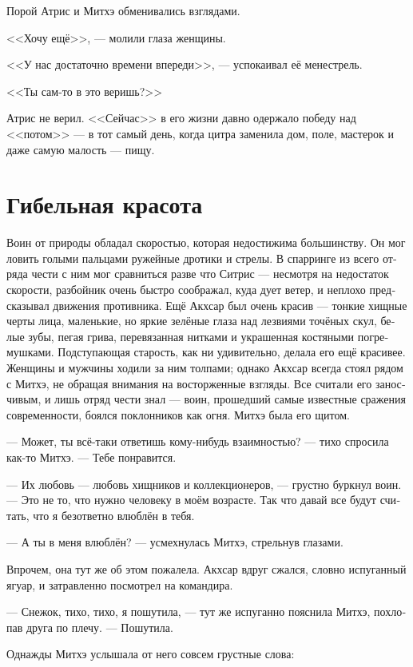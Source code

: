 \documentclass[a4paper,12pt,fleqn]{book}\usepackage{cooltooltips}\usepackage{polyglossia}\setdefaultlanguage[babelshorthands=true]{russian}\setotherlanguage{english}\defaultfontfeatures{Ligatures=TeX,Mapping=tex-text} \usepackage{xcolor}\definecolor{lightgray}{HTML}{bbbbbb}\color{lightgray}\newcommand{\ml}[3]{\textenglish{\textcolor{black}{#3}}}
\begin{document}
{Порой Атрис и Митхэ обменивались взглядами.

<<Хочу ещё>>, --- молили глаза женщины.

<<У нас достаточно времени впереди>>, --- успокаивал её менестрель.

<<Ты сам-то в это веришь?>>

Атрис не верил.
<<Сейчас>> в его жизни давно одержало победу над <<потом>> --- в тот самый день, когда цитра заменила дом, поле, мастерок и даже самую малость --- пищу.

\section{Гибельная красота}

Воин от природы обладал скоростью, которая недостижима большинству.
Он мог ловить голыми пальцами ружейные дротики и стрелы.
В спарринге из всего отряда чести с ним мог сравниться разве что Ситрис --- несмотря на недостаток скорости, разбойник очень быстро соображал, куда дует ветер, и неплохо предсказывал движения противника.
Ещё Акхсар был очень красив --- тонкие хищные черты лица, маленькие, но яркие зелёные глаза над лезвиями точёных скул, белые зубы, пегая грива, перевязанная нитками и украшенная костяными погремушками.
Подступающая старость, как ни удивительно, делала его ещё красивее.
Женщины и мужчины ходили за ним толпами;
однако Акхсар всегда стоял рядом с Митхэ, не обращая внимания на восторженные взгляды.
Все считали его заносчивым, и лишь отряд чести знал --- воин, прошедший самые известные сражения современности, боялся поклонников как огня.
Митхэ была его щитом.

--- Может, ты всё-таки ответишь кому-нибудь взаимностью? --- тихо спросила как-то Митхэ.
--- Тебе понравится.

--- Их любовь --- любовь хищников и коллекционеров, --- грустно буркнул воин.
--- Это не то, что нужно человеку в моём возрасте.
Так что давай все будут считать, что я безответно влюблён в тебя.

--- А ты в меня влюблён? --- усмехнулась Митхэ, стрельнув глазами.

Впрочем, она тут же об этом пожалела.
Акхсар вдруг сжался, словно испуганный ягуар, и затравленно посмотрел на командира.

--- Снежок, тихо, тихо, я пошутила, --- тут же испуганно пояснила Митхэ, похлопав друга по плечу.
--- Пошутила.

Однажды Митхэ услышала от него совсем грустные слова:

}
\end{document}
